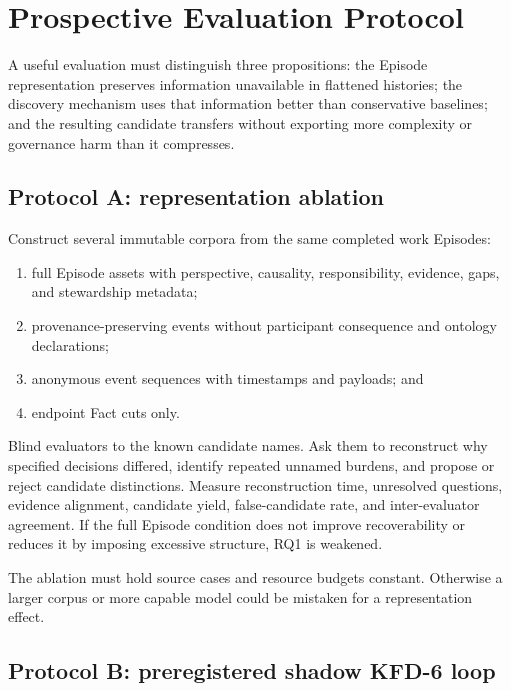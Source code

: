 \section{Prospective Evaluation Protocol}
\label{sec:evaluation}

A useful evaluation must distinguish three propositions: the Episode
representation preserves information unavailable in flattened histories; the
discovery mechanism uses that information better than conservative baselines;
and the resulting candidate transfers without exporting more complexity or
governance harm than it compresses.

\subsection{Protocol A: representation ablation}

Construct several immutable corpora from the same completed work Episodes:

\begin{enumerate}[leftmargin=*]
  \item full Episode assets with perspective, causality, responsibility,
        evidence, gaps, and stewardship metadata;
  \item provenance-preserving events without participant consequence and
        ontology declarations;
  \item anonymous event sequences with timestamps and payloads; and
  \item endpoint Fact cuts only.
\end{enumerate}

Blind evaluators to the known candidate names. Ask them to reconstruct why
specified decisions differed, identify repeated unnamed burdens, and propose
or reject candidate distinctions. Measure reconstruction time, unresolved
questions, evidence alignment, candidate yield, false-candidate rate, and
inter-evaluator agreement. If the full Episode condition does not improve
recoverability or reduces it by imposing excessive structure, RQ1 is weakened.

The ablation must hold source cases and resource budgets constant. Otherwise a
larger corpus or more capable model could be mistaken for a representation
effect.

\subsection{Protocol B: preregistered shadow KFD-6 loop}

